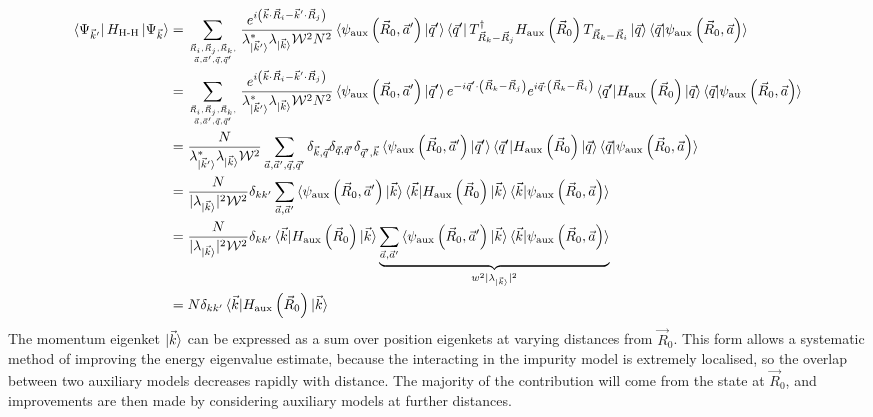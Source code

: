 \documentclass[prb]{revtex4-2}
\begin{document}
\begin{equation}\begin{aligned}
	\bra{\Psi_{\vec k^\prime}}H_\text{H-H} \ket{\Psi_{\vec k}} &= \sum_{\vec R_i, \vec R_j, \vec R_k, \atop{\vec a, \vec a^\prime, \vec q, \vec q^\prime}}\frac{e^{i\left(\vec{k}\cdot\vec{R}_i - \vec{k}^\prime\cdot\vec{R}_j\right)}}{\lambda^*_{\ket{\vec k^\prime}} \lambda_{\ket{\vec k}} \mathcal{W}^2 N^2} \braket{\psi_\text{aux}\left(\vec R_0, \vec a^\prime\right)| \vec q^\prime}\bra{\vec q^\prime} T^\dagger_{\vec R_k - \vec R_j} H_\text{aux}\left(\vec R_0\right) T_{\vec R_k - \vec R_i}  \ket{\vec q}\braket{\vec q | \psi_\text{aux}\left(\vec R_0, \vec a\right)}\\
								   &= \sum_{\vec R_i, \vec R_j, \vec R_k, \atop{\vec a, \vec a^\prime, \vec q, \vec q^\prime}}\frac{e^{i\left(\vec{k}\cdot\vec{R}_i - \vec{k}^\prime\cdot\vec{R}_j\right)}}{\lambda^*_{\ket{\vec k^\prime}} \lambda_{\ket{\vec k}} \mathcal{W}^2 N^2} \braket{\psi_\text{aux}\left(\vec R_0, \vec a^\prime\right)| \vec q^\prime} e^{-i \vec q^\prime \cdot \left(\vec R_k - \vec R_j\right) } e^{i \vec q \cdot \left(\vec R_k - \vec R_i\right)} \braket{\vec q^\prime | H_\text{aux}\left(\vec R_0\right) | \vec q}  \braket{\vec q | \psi_\text{aux}\left(\vec R_0, \vec a\right)}\\
								   &= \frac{N}{\lambda^*_{\ket{\vec k^\prime}} \lambda_{\ket{\vec k}} \mathcal{W}^2}\sum_{\vec a, \vec a^\prime, \vec q, \vec q^\prime} \delta_{\vec k, \vec q} \delta_{\vec q,\vec q^\prime} \delta_{\vec q^\prime,\vec k} \braket{\psi_\text{aux}\left(\vec R_0, \vec a^\prime\right)| \vec q^\prime} \braket{\vec q^\prime | H_\text{aux}\left(\vec R_0\right) | \vec q}  \braket{\vec q | \psi_\text{aux}\left(\vec R_0, \vec a\right)}\\
								   &= \frac{N}{|\lambda_{\ket{\vec k}}|^2 \mathcal{W}^2}\delta_{kk^\prime}\sum_{\vec a, \vec a^\prime} \braket{\psi_\text{aux}\left(\vec R_0, \vec a^\prime\right)| \vec k} \braket{\vec k | H_\text{aux}\left(\vec R_0\right) | \vec k}  \braket{\vec k | \psi_\text{aux}\left(\vec R_0, \vec a\right)}\\
								   &= \frac{N}{|\lambda_{\ket{\vec k}}|^2 \mathcal{W}^2}\delta_{kk^\prime}\braket{\vec k | H_\text{aux}\left(\vec R_0\right) | \vec k} \underbrace{\sum_{\vec a, \vec a^\prime} \braket{\psi_\text{aux}\left(\vec R_0, \vec a^\prime\right)| \vec k} \braket{\vec k | \psi_\text{aux}\left(\vec R_0, \vec a\right)}}_{w^2 |\lambda_{\ket{\vec k}}|^2}\\
	&= N\delta_{kk^\prime}\braket{\vec k | H_\text{aux}\left(\vec R_0\right) | \vec k}
\end{aligned}\end{equation}
The momentum eigenket \(\ket{\vec k}\) can be expressed as a sum over position eigenkets at varying distances from \(\vec R_0\). This form allows a systematic method of improving the energy eigenvalue estimate, because the interacting in the impurity model is extremely localised, so the overlap between two auxiliary models decreases rapidly with distance. The majority of the contribution will come from the state at \(\vec R_0\), and improvements are then made by considering auxiliary models at further distances. 


\end{document}

